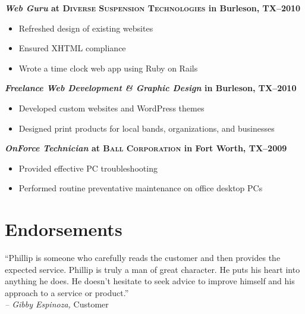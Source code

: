 \documentclass[margin]{res}
\newcommand{\sectionspace}{\vspace{8pt}}
\begin{document}
\begin{resume}
                \textbf{\textit{Web Guru}
                 at \textsc{Diverse Suspension Technologies} in Burleson, TX--2010}
                 \vspace{-10pt}\begin{itemize} \itemsep -2pt %
                   \item Refreshed design of existing websites
                   \item Ensured XHTML compliance
                   \item Wrote a time clock web app using Ruby on Rails
                \end{itemize}

                \textbf{\textit{Freelance Web Development \textrm{\&} Graphic Design}
                in Burleson, TX--2010}
                \vspace{-10pt}\begin{itemize} \itemsep -2pt %
                  \item Developed custom websites and WordPress themes
                  \item Designed print products for local bands, organizations, and businesses
                \end{itemize}

                \textbf{\textit{OnForce Technician}
                at \textsc{Ball Corporation} in Fort Worth, TX--2009}
                \vspace{-10pt}\begin{itemize} \itemsep -2pt %
                  \item Provided effective PC troubleshooting
                  \item Performed routine preventative maintenance on office desktop PCs
                \end{itemize}

\sectionspace


\section{\textsf{Endorsements}}

                ``Phillip is someone who carefully reads the customer and then
                provides the expected service. Phillip is truly a man of great character.
                He puts his heart into anything he does. He doesn't hesitate to seek advice
                to improve himself and his approach to a service or product.''                    \\
                \textit{-- Gibby Espinoza,} Customer


\end{resume}
\end{document}

